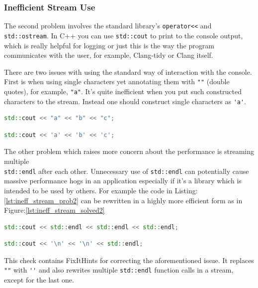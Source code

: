 \subsubsection{Inefficient Stream Use}
\par The second problem involves the standard library's \verb|operator<<| and \verb|std::ostream|. In C++ you can use
\verb|std::cout| to print to the console output, which is really helpful for logging or just this is the way the program communicates with the user, for example, Clang-tidy or Clang itself.\medskip
\par There are two issues with using the standard way of interaction with the console. First is when using single characters yet annotating them with \verb|""| (double quotes), for example, \verb|"a"|. It's quite inefficient when you put such constructed characters to the stream. Instead one should construct single characters as \verb|'a'|.\medskip
\begin{lstlisting}[language=c++, frame=single ,caption={Sightly inefficient way of streaming characters}, label={lst:ineff_stream_pro}]
std::cout << "a" << "b" << "c";
\end{lstlisting}
\begin{lstlisting}[language=c++, frame=single ,caption={A generally more efficient version}, label={lst:ineff_stream_solved}]
std::cout << 'a' << 'b' << 'c';
\end{lstlisting}
\par The other problem which raises more concern about the performance is streaming multiple \\\verb|std::endl| after each other. Unnecessary use of \verb|std::endl| can potentially cause massive performance hogs in an application especially if it's a library which is intended to be used by others. For example the code in Listing:\ref{lst:ineff_stream_prob2} can be rewritten in a highly more efficient form as in Figure:\ref{lst:ineff_stream_solved2}
\begin{lstlisting}[language=c++, frame=single ,caption={A really slow way to print newlines}, label={lst:ineff_stream_prob2}]
std::cout << std::endl << std::endl << std::endl;
\end{lstlisting}
\begin{lstlisting}[language=c++, frame=single ,caption={A more efficient version}, label={lst:ineff_stream_solved2}]
std::cout << '\n' << '\n' << std::endl;
\end{lstlisting}
\par This check contains FixItHints for correcting the aforementioned issue. It replaces \verb|""| with \verb|''| and also rewrites multiple \verb|std::endl| function calls in a stream, except for the last one.
